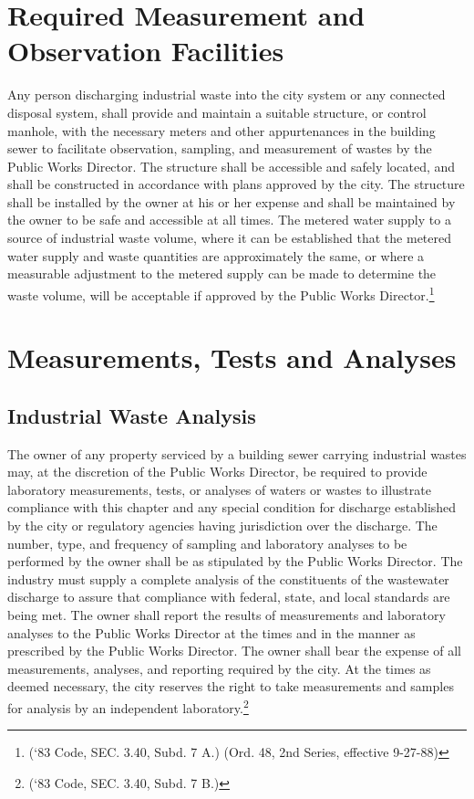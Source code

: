 
\setcounter{section}{34}
\section{Required Measurement and Observation Facilities}
Any person discharging industrial waste into the city system or any connected disposal system, shall provide and maintain a suitable structure, or control manhole, with the necessary meters and other appurtenances in the building sewer to facilitate observation, sampling, and measurement of wastes by the Public Works Director. The structure shall be accessible and safely located, and shall be constructed in accordance with plans approved by the city. The structure shall be installed by the owner at his or her expense and shall be maintained by the owner to be safe and accessible at all times. The metered water supply to a source of industrial waste volume, where it can be established that the metered water supply and waste quantities are approximately the same, or where a measurable adjustment to the metered supply can be made to determine the waste volume, will be acceptable if approved by the Public Works Director.\footnote{(‘83 Code, SEC. 3.40, Subd. 7 A.) (Ord. 48, 2nd Series, effective 9-27-88)}

\section{Measurements, Tests and Analyses}
\subsection{Industrial Waste Analysis}
The owner of any property serviced by a building sewer carrying industrial wastes may, at the discretion of the Public Works Director, be required to provide laboratory measurements, tests, or analyses of waters or wastes to illustrate compliance with this chapter and any special condition for discharge established by the city or regulatory agencies having jurisdiction over the discharge.  The number, type, and frequency of sampling and laboratory analyses to be performed by the owner shall be as stipulated by the Public Works Director.  The industry must supply a complete analysis of the constituents of the wastewater discharge to assure that compliance with federal, state, and local standards are being met.  The owner shall report the results of measurements and laboratory analyses to the Public Works Director at the times and in the manner as prescribed by the Public Works Director.  The owner shall bear the expense of all measurements, analyses, and reporting required by the city.  At the times as deemed necessary, the city reserves the right to take measurements and samples for analysis by an independent laboratory.\footnote{(‘83 Code, SEC. 3.40, Subd. 7 B.)}
